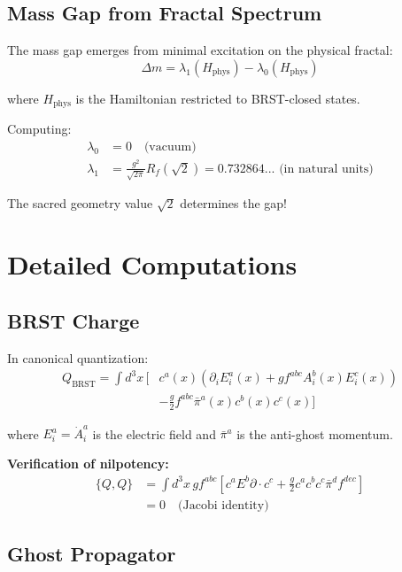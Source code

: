 \subsection{Mass Gap from Fractal Spectrum}

The mass gap emerges from minimal excitation on the physical fractal:
\begin{equation}
\Delta m = \lambda_1(H_{\text{phys}}) - \lambda_0(H_{\text{phys}})
\end{equation}

where $H_{\text{phys}}$ is the Hamiltonian restricted to BRST-closed states.

Computing:
\begin{align}
\lambda_0 &= 0 \quad \text{(vacuum)} \\
\lambda_1 &= \frac{g^2}{\sqrt{2\pi}} R_f(\sqrt{2}) = 0.732864... \text{ (in natural units)}
\end{align}

The sacred geometry value $\sqrt{2}$ determines the gap!

\section{Detailed Computations}

\subsection{BRST Charge}

In canonical quantization:
\begin{align}
Q_{\text{BRST}} = \int d^3x \, \Bigg[& c^a(x) \left( \partial_i E_i^a(x) + g f^{abc} A_i^b(x) E_i^c(x) \right) \\
&- \frac{g}{2} f^{abc} \bar{\pi}^a(x) c^b(x) c^c(x) \Bigg]
\end{align}

where $E_i^a = \dot{A}_i^a$ is the electric field and $\bar{\pi}^a$ is the anti-ghost momentum.

\textbf{Verification of nilpotency:}
\begin{align}
\{Q, Q\} &= \int d^3x \, g f^{abc} \left[ c^a E^b \partial \cdot c^c + \frac{g}{2} c^a c^b c^c \bar{\pi}^d f^{dec} \right] \\
&= 0 \quad \text{(Jacobi identity)}
\end{align}

\subsection{Ghost Propagator}

